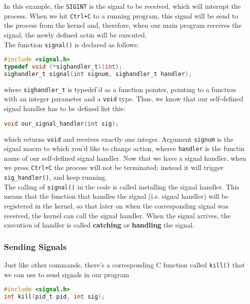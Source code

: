 \documentclass{article}
\newcommand{\bold}[1]{\textbf{#1}}
\newcommand{\code}[1]{\texttt{#1}}
\begin{document}
\noindent In this example, the \code{SIGINT} is the signal to be received, which will interupt the process. When we hit \code{Ctrl+C} to a running program, this signal will be send to the process from the kernel and, therefore, when our main program receives the signal, the newly defined actin will be executed. \\ 

\noindent The function \code{signal()} is declared as follows:

\begin{lstlisting}[language=C]
#include <signal.h>
typedef void (*sighandler_t)(int);
sighandler_t signal(int signum, sighandler_t handler);
\end{lstlisting}

\noindent where \code{sighandler\_t} is typedef'd as a function pointer, pointing to a function with an integer parameter and a \code{void} type. Thus, we know that our self-defined signal handler has to be defined list this:

\begin{lstlisting}[language=C]
void our_signal_handler(int sig);
\end{lstlisting}

\noindent which returns \code{void} and receives exactly one integer. Argument \code{signum} is the signal macro to which you'd like to change action, wheree \code{handler} is the functin name of our self-defined signal handler. Now that we have a signal handler, when we press \code{Ctrl+C} the process will not be terminated; instead it will trigger \code{sig\_handler()}, and keep running. \\ 

\noindent The calling of \code{signal()} in the code is called installing the signal handler. This means that the function that handles the signal (i.e. signal handler) will be registered in the kernel, so that later on when the corresponding signal was received, the kernel can call the signal handler. When the signal arrives, the execution of handler is called \bold{catching} or \bold{handling} the signal. 

\subsubsection{Sending Signals}

Just like other commands, there's a corresponding C function called \code{kill()} that we can use to send signals in our program 

\begin{lstlisting}[language=C]
#include <signal.h>
int kill(pid_t pid, int sig);
\end{lstlisting}
\end{document}
